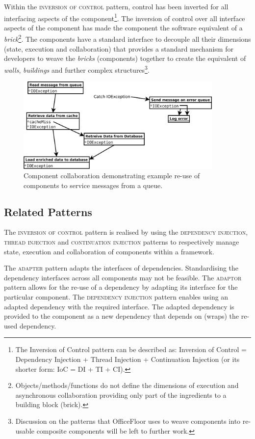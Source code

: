 \documentclass[prodmode]{style/acmlarge}
\begin{document}
Within the \textsc{inversion of control} pattern, control has been inverted for
all interfacing aspects of the component\footnote{The Inversion of Control
pattern can be described as: Inversion of Control = Dependency Injection +
Thread Injection + Continuation Injection (or its shorter form: IoC = DI + TI +
CI).}.  The inversion of control over all interface aspects of the component has
made the component the software equivalent of a
\textit{brick}\footnote{Objects/methods/functions do not define the dimensions
of execution and asynchronous collaboration providing only part of the
ingredients to a building block (brick).}.  The components have a standard
interface to decouple all their dimensions (state, execution and collaboration)
that provides a standard mechanism for developers to weave the \textit{bricks}
(components) together to create the equivalent of \textit{walls},
\textit{buildings} and further complex structures\footnote{Discussion on the
patterns that OfficeFloor \cite{officefloor} uses to weave components into
re-usable composite components will be left to further work.}.

\begin{figure}[t]
\centering
\includegraphics[width=4in]{IocReuseForQueue}
\caption{Component collaboration demonstrating example re-use of components to service messages from a queue.}
\label{fig:IocReuseForQueue}
\end{figure}


\subsection{Related Patterns}

The \textsc{inversion of control} pattern is realised by using the
\textsc{dependency injection}, \textsc{thread injection} and
\textsc{continuation injection} patterns to respectively manage state, execution
and collaboration of components within a framework.

The \textsc{adapter} pattern \cite{gof} adapts the interfaces of dependencies.
Standardising the dependency interfaces across all components may not be
feasible.  The \textsc{adaptor} pattern allows for the re-use of a dependency by
adapting its interface for the particular component.  The \textsc{dependency
injection} pattern enables using an adapted dependency with the required
interface.  The adapted dependency is provided to the component as a new
dependency that depends on (wraps) the re-used dependency.
\end{document}
